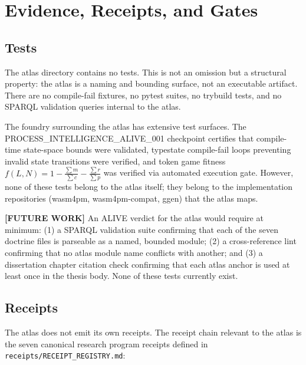 
\section{Evidence, Receipts, and Gates}
\label{sec:atlas-evidence}

\subsection{Tests}
\label{sec:atlas-evidence-tests}

The atlas directory contains no tests. This is not an omission but a structural
property: the atlas is a naming and bounding surface, not an executable
artifact. There are no compile-fail fixtures, no pytest suites, no trybuild
tests, and no SPARQL validation queries internal to the atlas.

The foundry surrounding the atlas has extensive test surfaces. The
PROCESS\_INTELLIGENCE\_ALIVE\_001 checkpoint certifies that compile-time
state-space bounds were validated, typestate compile-fail loops preventing
invalid state transitions were verified, and token game fitness
$f(L, N) = 1 - \frac{\sum m}{\sum c} - \frac{\sum r}{\sum p}$ was verified via
automated execution gate. However, none of these tests belong to the atlas
itself; they belong to the implementation repositories (wasm4pm, wasm4pm-compat,
ggen) that the atlas maps.

\textbf{[FUTURE WORK]} An ALIVE verdict for the atlas would require at minimum:
(1) a SPARQL validation suite confirming that each of the seven doctrine files
is parseable as a named, bounded module; (2) a cross-reference lint confirming
that no atlas module name conflicts with another; and (3) a dissertation
chapter citation check confirming that each atlas anchor is used at least once
in the thesis body. None of these tests currently exist.

\subsection{Receipts}
\label{sec:atlas-evidence-receipts}

The atlas does not emit its own receipts. The receipt chain relevant to the
atlas is the seven canonical research program receipts defined in
\texttt{receipts/RECEIPT\_REGISTRY.md}:

